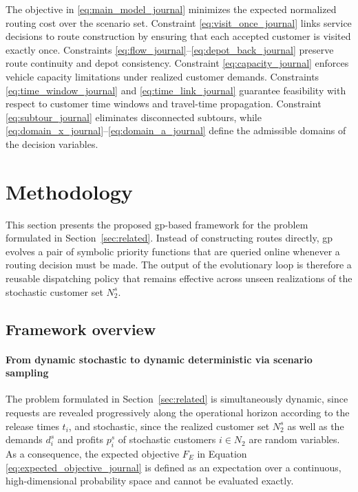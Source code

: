 \documentclass[pdflatex]{sn-jnl}
\begin{document}
The objective in \eqref{eq:main_model_journal} minimizes the expected normalized routing cost over the scenario set.
Constraint \eqref{eq:visit_once_journal} links service decisions to route construction by ensuring that each accepted customer is visited exactly once.
Constraints \eqref{eq:flow_journal}--\eqref{eq:depot_back_journal} preserve route continuity and depot consistency.
Constraint \eqref{eq:capacity_journal} enforces vehicle capacity limitations under realized customer demands.
Constraints \eqref{eq:time_window_journal} and \eqref{eq:time_link_journal} guarantee feasibility with respect to customer time windows and travel-time propagation.
Constraint \eqref{eq:subtour_journal} eliminates disconnected subtours, while \eqref{eq:domain_x_journal}--\eqref{eq:domain_a_journal} define the admissible domains of the decision variables.


\section{Methodology} \label{sec:propose}
This section presents the proposed \gls{gp}-based framework for the problem
formulated in Section~\ref{sec:related}. Instead of constructing routes directly,
\gls{gp} evolves a pair of symbolic priority functions that are queried
online whenever a routing decision must be made. The output of the
evolutionary loop is therefore a reusable dispatching policy that
remains effective across unseen realizations of the stochastic customer
set $N_2^s$.

\subsection{Framework overview} \label{subsec:framework}

\paragraph{From dynamic stochastic to dynamic deterministic via
scenario sampling}
The problem formulated in Section~\ref{sec:related} is simultaneously
dynamic, since requests are revealed progressively along the
operational horizon according to the release times $t_i$, and
stochastic, since the realized customer set $N_2^s$ as well as the
demands $d_i^s$ and profits $p_i^s$ of stochastic customers $i\in N_2$
are random variables. As a consequence, the expected objective $F_E$
in Equation \ref{eq:expected_objective_journal} is defined as an
expectation over a continuous, high-dimensional probability space and
cannot be evaluated exactly.
\end{document}

